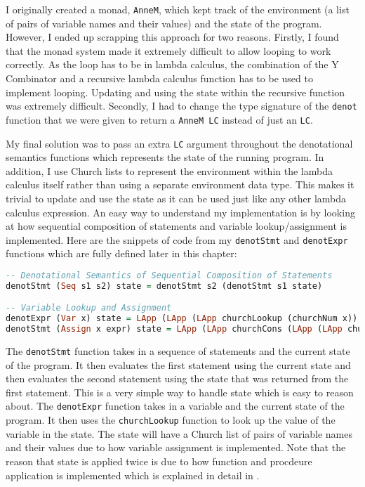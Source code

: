 I originally created a monad, \texttt{AnneM}, which kept track of the environment (a list of
pairs of variable names and their values) and the state of the program. However, I ended
up scrapping this approach for two reasons. Firstly, I found that the monad system made it extremely
difficult to allow looping to work correctly. As the loop has to be in lambda calculus, the combination
of the Y Combinator and a recursive lambda calculus function has to be used to implement looping. Updating and
using the state within the recursive function was extremely difficult. Secondly, I had to change the type signature of the \texttt{denot}
function that we were given to return a \texttt{AnneM LC} instead of just an \texttt{LC}.

My final solution was to pass an extra \texttt{LC} argument throughout the denotational semantics functions which represents
the state of the running program. In addition, I use Church lists to represent the environment within the lambda calculus itself
rather than using a separate environment data type. This makes it trivial to update and use the state as it can be used just like any other
lambda calculus expression. An easy way to understand my implementation is by looking at how sequential composition of statements and
variable lookup/assignment is implemented. Here are the snippets of code from my \texttt{denotStmt} and \texttt{denotExpr} functions which are fully defined later
in this chapter:

\begin{lstlisting}[language=Haskell]
-- Denotational Semantics of Sequential Composition of Statements
denotStmt (Seq s1 s2) state = denotStmt s2 (denotStmt s1 state)

-- Variable Lookup and Assignment
denotExpr (Var x) state = LApp (LApp (LApp churchLookup (churchNum x)) state) state
denotStmt (Assign x expr) state = LApp (LApp churchCons (LApp (LApp churchPair (churchNum x)) (LAbs 0 (denotExpr expr state)))) state
\end{lstlisting}

The \texttt{denotStmt} function takes in a sequence of statements and the current state of the program. It then evaluates the first statement
using the current state and then evaluates the second statement using the state that was returned from the first statement. This is a very
simple way to handle state which is easy to reason about. The \texttt{denotExpr} function takes in a variable and the current state of the program.
It then uses the \texttt{churchLookup} function to look up the value of the variable in the state. The state will have a Church list of pairs of variable
names and their values due to how variable assignment is implemented. Note that the reason that state is applied twice is due to how function and procdeure
application is implemented which is explained in detail in .

